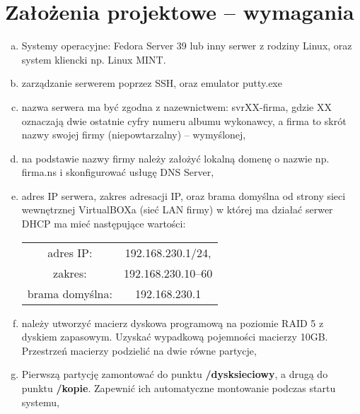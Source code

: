 \documentclass[a4paper]{article}
\begin{document}
\section{Założenia projektowe – wymagania}
\begin{enumerate}[a)] %
      \item Systemy operacyjne: Fedora Server 39 lub inny serwer z rodziny Linux, oraz system kliencki
            np. Linux MINT.
      \item zarządzanie serwerem poprzez SSH, oraz emulator putty.exe
      \item nazwa serwera ma być zgodna z nazewnictwem: svrXX-firma, gdzie XX oznaczają dwie
            ostatnie cyfry numeru albumu wykonawcy, a firma to skrót nazwy swojej
            firmy (niepowtarzalny) – wymyślonej,
      \item na podstawie nazwy firmy należy założyć lokalną domenę o nazwie np. firma.ns i
            skonfigurować usługę DNS Server,
      \item adres IP serwera, zakres adresacji IP, oraz brama domyślna od strony sieci wewnętrznej
            VirtualBOXa (sieć LAN firmy) w której ma działać serwer DHCP ma mieć następujące
            wartości:
            \vspace{-2mm}
            \begin{center}
                  \begin{tabular}{cc}
                        adres IP:       & 192.168.230.1/24, \\
                        zakres:         & 192.168.230.10–60 \\
                        brama domyślna: & 192.168.230.1     \\
                  \end{tabular}
            \end{center}
            \vspace{-2mm}
      \item należy utworzyć macierz dyskowa programową na poziomie RAID 5 z dyskiem zapasowym.
            Uzyskać wypadkową pojemności macierzy 10GB. Przestrzeń macierzy podzielić na dwie
            równe partycje,
      \item Pierwszą partycję zamontować do punktu \textbf{/dysksieciowy}, a drugą do punktu \textbf{/kopie}.
            Zapewnić ich automatyczne montowanie podczas startu systemu,

\end{enumerate}
\end{document}
